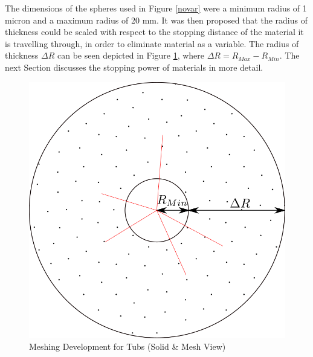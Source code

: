 \documentclass[12pt,a4paper]{article}
\begin{document}
\noindent The dimensions of the spheres used in Figure \ref{novar} were a minimum radius of 1 micron and a maximum radius of 20 mm. It was then proposed that the radius of thickness could be scaled with respect to the stopping distance of the material it is travelling through, in order to eliminate material as a variable. The radius of thickness $\Delta R$ can be seen depicted in Figure \ref{deltar}, where $\Delta R = R_{Max} - R_{Min}$. The next Section discusses the stopping power of materials in more detail.

\begin{figure}[h!]
\centering
\includegraphics[scale=0.2]{Images//Materials//RMAX.png}
\caption[width=\columnwidth]{Meshing Development for Tubs (Solid \& Mesh View)}
\label{deltar}
\end{figure}


\newpage
\end{document}
